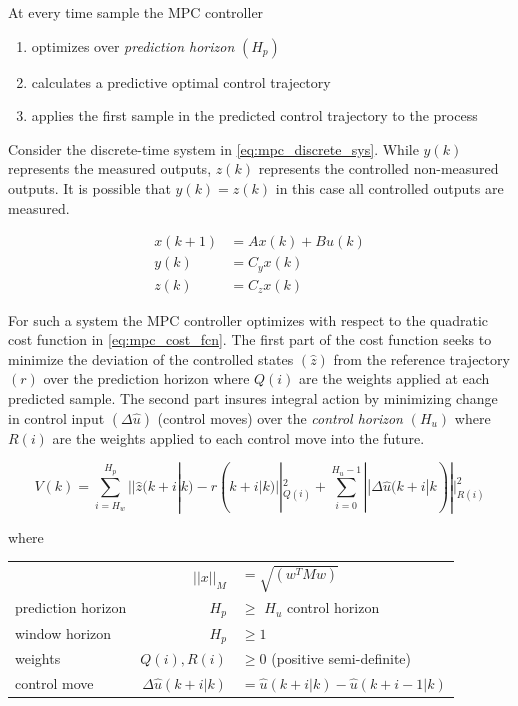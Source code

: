 At every time sample the MPC controller
\begin{enumerate}
	\item optimizes over \textit{prediction horizon} $(H_p)$
	\item calculates a predictive optimal control trajectory
	\item applies the first sample in the predicted control trajectory to the process
\end{enumerate}

\medskip

Consider the discrete-time system in \cref{eq:mpc_discrete_sys}. While $y(k)$ represents the measured outputs, $z(k)$ represents the controlled non-measured outputs. It is possible that $y(k) = z(k)$ in this case all controlled outputs are measured.

\begin{equation} \label{eq:mpc_discrete_sys}
	\begin{split}
		x(k+1) 	& = Ax(k) + Bu(k) \\
		y(k) 	& = C_yx(k) \\
		z(k) 	& = C_zx(k)
	\end{split}
\end{equation}

For such a system the MPC controller optimizes with respect to the quadratic cost function in \cref{eq:mpc_cost_fcn}. The first part of the cost function seeks to minimize the deviation of the controlled states $(\hat{z})$ from the reference trajectory $(r)$ over the prediction horizon where $Q(i)$ are the weights applied at each predicted sample. The second part insures integral action by minimizing change in control input $(\Delta \hat{u})$ (control moves) over the \textit{control horizon} $(H_u)$ where $R(i)$ are the weights applied to each control move into the future.

\begin{equation} \label{eq:mpc_cost_fcn}
	V(k) = \sum_{i=H_w}^{H_p}||\hat{z}(k+i|k) - r(k+i|k)||^2_{Q(i)} + \sum_{i=0}^{H_u-1}||\Delta \hat{u}(k+i|k)||^2_{R(i)}
\end{equation}

where

\begin{center}
	\begin{tabular}{l r l }
		                   & $||x||_M$               & $= \sqrt{\left(w^TMw\right)}$                    \\
		prediction horizon & $H_p$                   & $\ge$ $H_u$ control horizon           \\
		window horizon     & $H_p$                   & $\ge 1$                               \\
		weights            & $Q(i), R(i)$            & $\ge 0$ (positive semi-definite)      \\
		control move       & $\Delta \hat{u}(k+i|k)$ & $= \hat{u}(k+i|k) - \hat{u}(k+i-1|k)$
	\end{tabular}
\end{center}

